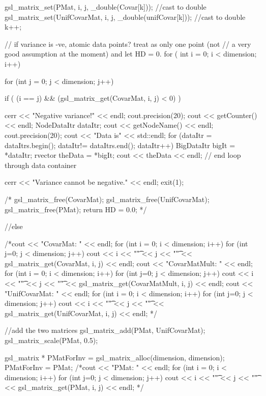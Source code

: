 \begin{DoxyCode}
{{{{          gsl_matrix_set(PMat, i, j, _double(Covar[k])); //cast to double
          gsl_matrix_set(UnifCovarMat, i, j, _double(unifCovar[k])); //cast to
       double
          k++;
        }
      }

      // if variance is -ve, atomic data points? treat as only one point (not
      // a very good assumption at the moment) and let HD = 0. 
      for ( int i = 0; i < dimension; i++) {
        for (int j = 0; j < dimension; j++) {
          if ( (i == j) && (gsl_matrix_get(CovarMat, i, j) < 0) ) {
            cerr << "Negative variance!" << endl;
            cout.precision(20);
            cout << getCounter() << endl;
            NodeDataItr dataItr;
            cout << getNodeName() << endl;
            cout.precision(20);
            cout << "Data is" << std::endl;
            for (dataItr = dataItrs.begin();
              dataItr!= dataItrs.end(); dataItr++) {
              BigDataItr bigIt = *dataItr;
              rvector theData = *bigIt;
              cout << theData << endl; 
            } // end loop through data container
        
            cerr << "Variance cannot be negative." << endl; 
            exit(1); 
            
            /*
            gsl_matrix_free(CovarMat);
            gsl_matrix_free(UnifCovarMat);
            gsl_matrix_free(PMat);
            return HD = 0.0;
            */ 
          }
        }
      }
  
      //else {
        /*cout << "CovarMat: " << endl;
        for (int i = 0; i < dimension; i++) {
          for (int j=0; j < dimension; j++) {
            cout << i << "\t" << j << "\t" << gsl_matrix_get(CovarMat, i, j) <<
       endl; 
          }
        }
        cout << "CovarMatMult: " << endl;
        for (int i = 0; i < dimension; i++) {
          for (int j=0; j < dimension; j++) {
            cout << i << "\t" << j << "\t" << gsl_matrix_get(CovarMatMult, i,
       j) << endl; 
          }
        }
        cout << "UnifCovarMat: " << endl;
        for (int i = 0; i < dimension; i++) {
          for (int j=0; j < dimension; j++) {
            cout << i << "\t" << j << "\t" << gsl_matrix_get(UnifCovarMat, i,
       j) << endl; 
          }
        }*/

        //add the two matrices
        gsl_matrix_add(PMat, UnifCovarMat);
        gsl_matrix_scale(PMat, 0.5);
        
        gsl_matrix * PMatForInv = gsl_matrix_alloc(dimension, dimension);
        PMatForInv = PMat; 
        /*cout << "PMat: " << endl;
        for (int i = 0; i < dimension; i++) {
          for (int j=0; j < dimension; j++) {
            cout << i << "\t" << j << "\t" << gsl_matrix_get(PMat, i, j) <<
       endl; 
          }
        }*/

}}}
\end{DoxyCode}

